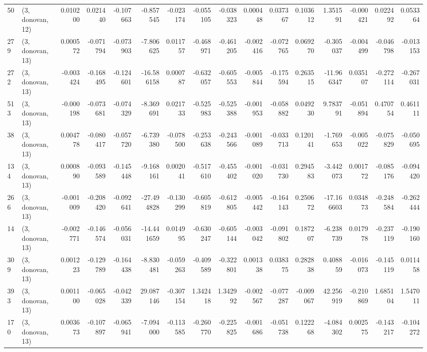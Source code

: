 \begin{tabular}{llrrrrrrrrrrrrrr}
50  &  (3, donovan, 12) &   0.010200 &  0.021440 & -0.107663 &   -0.857545 & -0.023174 &  -0.055105 &  -0.038323 &  0.000448 &  0.037367 &  0.103612 &    1.351591 & -0.000421 &   0.022492 &   0.053364 \\
279 &  (3, donovan, 13) &   0.000572 & -0.071794 & -0.073903 &   -7.806625 &  0.011757 &  -0.468971 &  -0.461205 & -0.002416 & -0.072765 &  0.069270 &   -0.305037 & -0.004499 &  -0.046798 &  -0.013153 \\
272 &  (3, donovan, 13) &  -0.003424 & -0.168495 & -0.124601 &  -16.586158 &  0.000787 &  -0.632057 &  -0.605553 & -0.005844 & -0.175594 &  0.263515 &  -11.966347 &  0.035107 &  -0.272114 &  -0.267031 \\
513 &  (3, donovan, 13) &  -0.000198 & -0.073681 & -0.074329 &   -8.369691 &  0.021733 &  -0.525983 &  -0.525388 & -0.001953 & -0.058882 &  0.049230 &    9.783791 & -0.051894 &   0.470754 &   0.461111 \\
38  &  (3, donovan, 13) &   0.004778 & -0.080417 & -0.057720 &   -6.739380 & -0.078500 &  -0.253638 &  -0.243566 & -0.001089 & -0.033713 &  0.120141 &   -1.769653 & -0.005022 &  -0.075829 &  -0.050695 \\
134 &  (3, donovan, 13) &   0.000890 & -0.093589 & -0.145448 &   -9.168161 &  0.002041 &  -0.517610 &  -0.455402 & -0.001020 & -0.031730 &  0.294583 &   -3.442073 &  0.001772 &  -0.085176 &  -0.094420 \\
266 &  (3, donovan, 13) &  -0.001009 & -0.208420 & -0.092641 &  -27.494828 & -0.130299 &  -0.605819 &  -0.612805 & -0.005442 & -0.164143 &  0.250672 &  -17.166603 &  0.034873 &  -0.248584 &  -0.262444 \\
14  &  (3, donovan, 13) &  -0.002771 & -0.146574 & -0.056031 &  -14.441659 &  0.014995 &  -0.630247 &  -0.605144 & -0.003042 & -0.091802 &  0.187207 &   -6.238739 &  0.017978 &  -0.237119 &  -0.190160 \\
309 &  (3, donovan, 13) &   0.001223 & -0.129789 & -0.164438 &   -8.830481 & -0.059263 &  -0.409589 &  -0.322801 &  0.001338 &  0.038375 &  0.282838 &    0.408859 & -0.016073 &  -0.145119 &   0.011458 \\
393 &  (3, donovan, 13) &   0.001100 & -0.065028 & -0.042339 &   29.087146 & -0.307154 &   1.342418 &   1.342992 & -0.002567 & -0.077287 & -0.009067 &   42.256919 & -0.210869 &   1.685104 &   1.547011 \\
170 &  (3, donovan, 13) &   0.003673 & -0.107897 & -0.065941 &   -7.094000 & -0.113585 &  -0.260770 &  -0.225825 & -0.001686 & -0.051738 &  0.122268 &   -4.084302 &  0.002575 &  -0.143217 &  -0.104272 \\

\end{tabular}
